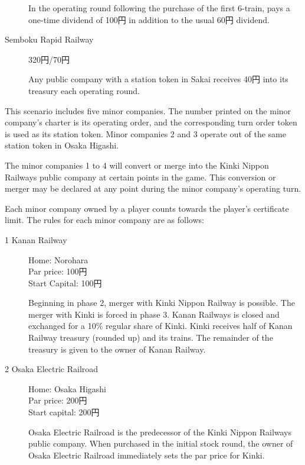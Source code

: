 \begin{multicols}{2}
\begin{description}
  In the operating round following the purchase of the first 6-train,
  pays a one-time dividend of 100円 in addition to the usual 60円 dividend.

\item[Semboku Rapid Railway] \hfill 320円/70円

  Any public company with a station token in Sakai receives 40円
  into its treasury each operating round.
\end{description}

 \label{sec:minor-companies}
This scenario includes five minor companies. The number printed on the
minor company's charter is its operating order, and the corresponding
turn order token is used as its station token. Minor companies 2 and 3
operate out of the same station token in Osaka Higashi.

The minor companies 1 to 4 will convert or merge into the Kinki Nippon
Railways public company at certain points in the game. This conversion
or merger may be declared at any point during the minor company's
operating turn.

Each minor company owned by a player counts towards the player's
certificate limit. The rules for each minor company are as follows:

\begin{description}

\item[1 Kanan Railway] \hfill

Home: Norohara \\
Par price: 100円 \\
Start Capital: 100円

Beginning in phase 2, merger with Kinki Nippon Railway is
possible. The merger with Kinki is forced in phase 3. Kanan Railways
is closed and exchanged for a 10\% regular share of Kinki. Kinki
receives half of Kanan Railway treasury (rounded up) and its
trains. The remainder of the treasury is given to the owner of Kanan
Railway.

\item[2 Osaka Electric Railroad] \hfill

Home: Osaka Higashi \\
Par price: 200円 \\
Start capital: 200円

Osaka Electric Railroad is the predecessor of the Kinki Nippon
Railways public company. When purchased in the initial stock round,
the owner of Osaka Electric Railroad immediately sets the par price
for Kinki.


\end{description}
\end{multicols}
